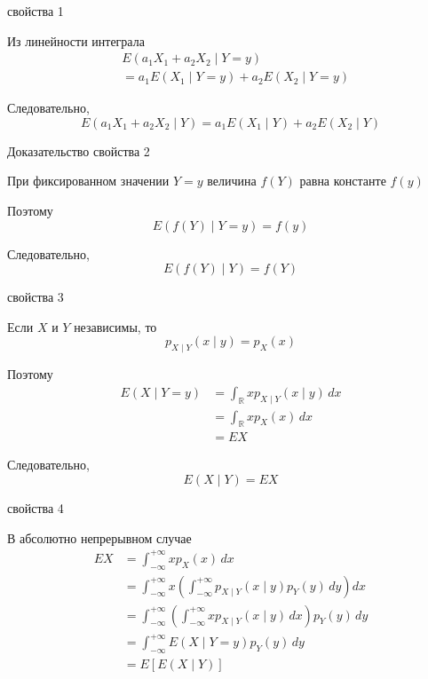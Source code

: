 \documentclass[12pt,a4paper]{article}
\begin{document}
\begin{proofbox}{свойства 1}

Из линейности интеграла
\[
\begin{aligned}
&E(a_1X_1+a_2X_2\mid Y=y)\\
&=
a_1E(X_1\mid Y=y)
+
a_2E(X_2\mid Y=y)
\end{aligned}
\]

Следовательно,
\[
E(a_1X_1+a_2X_2\mid Y)
=
a_1E(X_1\mid Y)+a_2E(X_2\mid Y)
\]

\end{proofbox}

\begin{proofbox}{Доказательство свойства 2}

При фиксированном значении $Y=y$ величина $f(Y)$ равна константе $f(y)$

Поэтому
\[
E(f(Y)\mid Y=y)
=
f(y)
\]

Следовательно,
\[
E(f(Y)\mid Y)=f(Y)
\]

\end{proofbox}

\begin{proofbox}{свойства 3}

Если $X$ и $Y$ независимы, то
\[
p_{X\mid Y}(x\mid y)=p_X(x)
\]

Поэтому
\[
\begin{aligned}
E(X\mid Y=y)
&=
\int_{\mathbb{R}}
x p_{X\mid Y}(x\mid y)\,dx\\
&=
\int_{\mathbb{R}}
x p_X(x)\,dx\\
&=
EX
\end{aligned}
\]

Следовательно,
\[
E(X\mid Y)=EX
\]

\end{proofbox}

\begin{proofbox}{свойства 4}

В абсолютно непрерывном случае
\[
\begin{aligned}
EX
&=
\int_{-\infty}^{+\infty}
x p_X(x)\,dx\\
&=
\int_{-\infty}^{+\infty}
x
\left(
\int_{-\infty}^{+\infty}
p_{X\mid Y}(x\mid y)p_Y(y)\,dy
\right)dx\\
&=
\int_{-\infty}^{+\infty}
\left(
\int_{-\infty}^{+\infty}
x p_{X\mid Y}(x\mid y)\,dx
\right)p_Y(y)\,dy\\
&=
\int_{-\infty}^{+\infty}
E(X\mid Y=y)p_Y(y)\,dy\\
&=
E[E(X\mid Y)]
\end{aligned}
\]

\end{proofbox}
\end{document}
